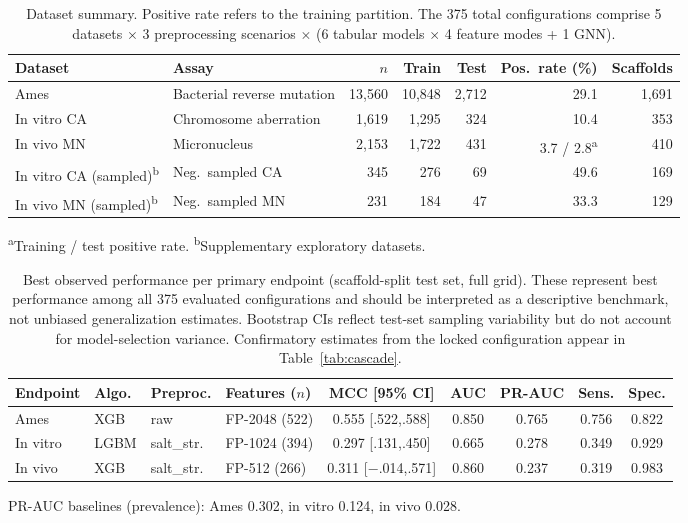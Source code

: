 
\begin{table}[ht]
\caption{Dataset summary. Positive rate refers to the training partition. The 375 total configurations comprise 5 datasets $\times$ 3 preprocessing scenarios $\times$ (6 tabular models $\times$ 4 feature modes + 1 GNN).}
\label{tab:datasets}
\centering
\small
\begin{tabular}{@{}llrrrrr@{}}
\toprule
Dataset & Assay & $n$ & Train & Test & Pos.\ rate (\%) & Scaffolds \\
\midrule
Ames & Bacterial reverse mutation & 13,560 & 10,848 & 2,712 & 29.1 & 1,691 \\
In vitro CA & Chromosome aberration & 1,619 & 1,295 & 324 & 10.4 & 353 \\
In vivo MN & Micronucleus & 2,153 & 1,722 & 431 & 3.7 / 2.8\textsuperscript{a} & 410 \\
\midrule
In vitro CA (sampled)\textsuperscript{b} & Neg.\ sampled CA & 345 & 276 & 69 & 49.6 & 169 \\
In vivo MN (sampled)\textsuperscript{b} & Neg.\ sampled MN & 231 & 184 & 47 & 33.3 & 129 \\
\bottomrule
\end{tabular}

\medskip
\footnotesize
\textsuperscript{a}Training / test positive rate.
\textsuperscript{b}Supplementary exploratory datasets.
\end{table}


\begin{table}[ht]
\caption{Best observed performance per primary endpoint (scaffold-split test set, full grid). These represent best performance among all 375 evaluated configurations and should be interpreted as a descriptive benchmark, not unbiased generalization estimates. Bootstrap CIs reflect test-set sampling variability but do not account for model-selection variance. Confirmatory estimates from the locked configuration appear in Table~\ref{tab:cascade}.}
\label{tab:best_models}
\centering
\small
\begin{tabular}{@{}llllccccc@{}}
\toprule
Endpoint & Algo. & Preproc. & Features ($n$) & MCC [95\% CI] & AUC & PR-AUC & Sens. & Spec. \\
\midrule
Ames & XGB & raw & FP-2048 (522) & 0.555 [.522,.588] & 0.850 & 0.765 & 0.756 & 0.822 \\
In vitro & LGBM & salt\_str. & FP-1024 (394) & 0.297 [.131,.450] & 0.665 & 0.278 & 0.349 & 0.929 \\
In vivo & XGB & salt\_str. & FP-512 (266) & 0.311 [$-$.014,.571] & 0.860 & 0.237 & 0.319 & 0.983 \\
\bottomrule
\end{tabular}

\medskip
\footnotesize
PR-AUC baselines (prevalence): Ames 0.302, in vitro 0.124, in vivo 0.028.
\end{table}


